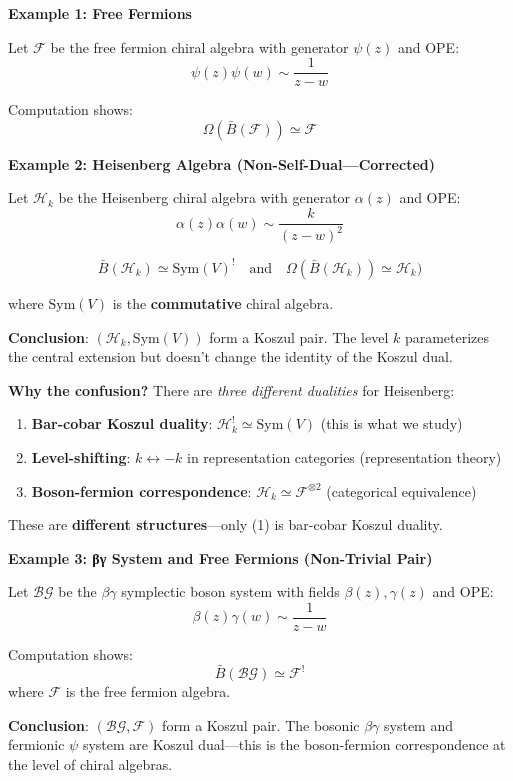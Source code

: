 \begin{example}
\label{ex:three-koszul-instances}

\textbf{Example 1: Free Fermions}

Let $\mathcal{F}$ be the free fermion chiral algebra with generator $\psi(z)$ and OPE:
$$\psi(z)\psi(w) \sim \frac{1}{z-w}$$

Computation shows:
$$\Omega(\bar{B}(\mathcal{F})) \simeq \mathcal{F}$$


\textbf{Example 2: Heisenberg Algebra (Non-Self-Dual—Corrected)}

Let $\mathcal{H}_k$ be the Heisenberg chiral algebra with generator $\alpha(z)$ and OPE:
$$\alpha(z)\alpha(w) \sim \frac{k}{(z-w)^2}$$
 
$$\bar{B}(\mathcal{H}_k) \simeq \text{Sym}(V)^! \quad \text{and} \quad 
  \Omega(\bar{B}(\mathcal{H}_k)) \simeq \mathcal{H}_k)$$

where $\text{Sym}(V)$ is the \textbf{commutative} chiral algebra.

\textbf{Conclusion}: $(\mathcal{H}_k, \text{Sym}(V))$ form a Koszul pair. The level $k$ 
parameterizes the central extension but doesn't change the identity of the Koszul dual.

\textbf{Why the confusion?} There are \emph{three different dualities} for Heisenberg:
\begin{enumerate}
\item \textbf{Bar-cobar Koszul duality}: $\mathcal{H}_k^! \simeq \text{Sym}(V)$ 
      (this is what we study)
\item \textbf{Level-shifting}: $k \leftrightarrow -k$ in representation categories 
      (representation theory)
\item \textbf{Boson-fermion correspondence}: $\mathcal{H}_k \simeq \mathcal{F}^{\otimes 2}$ 
      (categorical equivalence)
\end{enumerate}
These are \textbf{different structures}—only (1) is bar-cobar Koszul duality.

\textbf{Example 3: βγ System and Free Fermions (Non-Trivial Pair)}

Let $\mathcal{BG}$ be the $\beta\gamma$ symplectic boson system with fields $\beta(z), \gamma(z)$ 
and OPE:
$$\beta(z)\gamma(w) \sim \frac{1}{z-w}$$

Computation shows:
$$\bar{B}(\mathcal{BG}) \simeq \mathcal{F}^!$$
where $\mathcal{F}$ is the free fermion algebra.

\textbf{Conclusion}: $(\mathcal{BG}, \mathcal{F})$ form a Koszul pair. The bosonic $\beta\gamma$ 
system and fermionic $\psi$ system are Koszul dual—this is the boson-fermion correspondence 
at the level of chiral algebras.
\end{example}


